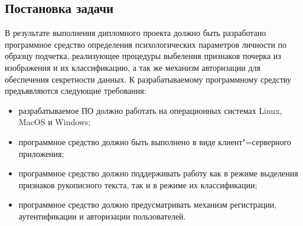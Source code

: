 \subsection{Постановка задачи}
В результате выполнения дипломного проекта должно быть разработано программное средство определения психологических параметров личности по образцу подчетка, реализующее процедуры выбеления признаков почерка из изображения и их классификацию, а так же механизм авторизации для обеспечения секретности данных. К разрабатываемому программному средству предъявляются следующие требования:
\begin{itemize}
\item разрабатываемое ПО должно работать на операционных системах Linux, MacOS и Windows;
\item программное средство должно быть выполнено в виде клиент"=серверного приложения;
\item программное средство должно поддерживать работу как в режиме выделения признаков рукописного текста, так и в режиме их классификации;
\item программное средство должно предусматривать механизм регистрации, аутентификации и авторизации пользователей.
\end{itemize}
